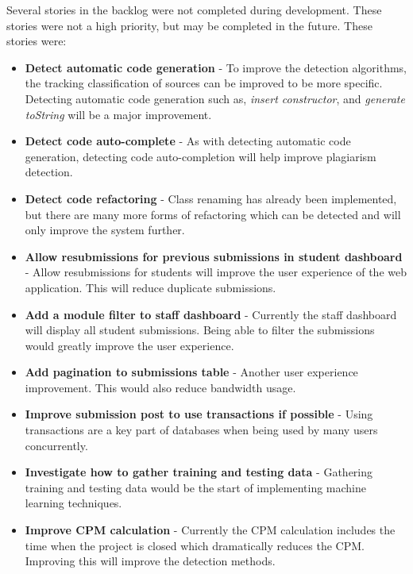Several stories in the backlog were not completed during development. These stories were not a high priority, but may be completed in the future. These stories were:

\begin{itemize}
\item \textbf{Detect automatic code generation} - To improve the detection algorithms, the tracking classification of sources can be improved to be more specific. Detecting automatic code generation such as, \textit{insert constructor}, and \textit{generate toString} will be a major improvement.
\item \textbf{Detect code auto-complete} - As with detecting automatic code generation, detecting code auto-completion will help improve plagiarism detection.
\item \textbf{Detect code refactoring} - Class renaming has already been implemented, but there are many more forms of refactoring which can be detected and will only improve the system further.
\item \textbf{Allow resubmissions for previous submissions in student dashboard} - Allow resubmissions for students will improve the user experience of the web application. This will reduce duplicate submissions.
\item \textbf{Add a module filter to staff dashboard} - Currently the staff dashboard will display all student submissions. Being able to filter the submissions would greatly improve the user experience.
\item \textbf{Add pagination to submissions table} - Another user experience improvement. This would also reduce bandwidth usage.
\item \textbf{Improve submission post to use transactions if possible} - Using transactions are a key part of databases when being used by many users concurrently.
\item \textbf{Investigate how to gather training and testing data} - Gathering training and testing data would be the start of implementing machine learning techniques.
\item \textbf{Improve CPM calculation} - Currently the CPM calculation includes the time when the project is closed which dramatically reduces the CPM. Improving this will improve the detection methods.
\end{itemize}
